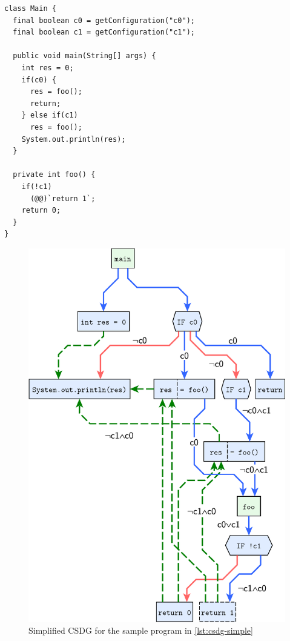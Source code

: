 \begin{lstlisting}[float=p,label=lst:csdg-simple,
  caption={Program using load-time variability resulting in the SDG in \autoref{fig:csdg-simple}}]
class Main {
  final boolean c0 = getConfiguration("c0");
  final boolean c1 = getConfiguration("c1");
  
  public void main(String[] args) {
    int res = 0;
    if(c0) {
      res = foo();
      return;
    } else if(c1)
      res = foo();
    System.out.println(res);
  }
  
  private int foo() {
    if(!c1)
      (@@)`return 1`;
    return 0;
  }
}
\end{lstlisting}

\begin{figure}[p]
  \centering
    \includegraphics[scale=0.6]{sdgs/simple-csdg}
  \caption{Simplified CSDG for the sample program in \autoref{lst:csdg-simple}}
  \label{fig:csdg-simple}
\end{figure}
